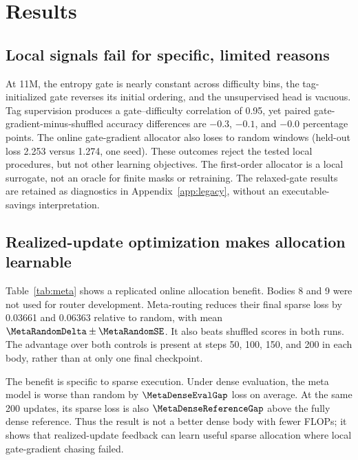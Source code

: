 \documentclass{article}
\begin{document}
\section{Results}

\subsection{Local signals fail for specific, limited reasons}
\label{sec:local-results}
At 11M, the entropy gate is nearly constant across difficulty bins, the
tag-initialized gate reverses its initial ordering, and the unsupervised head
is vacuous. Tag supervision produces a gate--difficulty correlation of 0.95,
yet paired gate-gradient-minus-shuffled accuracy differences are $-0.3$,
$-0.1$, and $-0.0$ percentage points. The online gate-gradient allocator also
loses to random windows (held-out loss 2.253 versus 1.274, one seed). These
outcomes reject the tested local procedures, but not other learning objectives.
The first-order allocator is a local surrogate, not an oracle for finite masks
or retraining. The relaxed-gate results are retained as diagnostics in
Appendix~\ref{app:legacy}, without an executable-savings interpretation.

\subsection{Realized-update optimization makes allocation learnable}
\label{sec:meta-results}
\begin{table}[H]
\centering
\caption{Online meta-routing after 200 steps at 50\% FFN activity. Losses use
sparse evaluation. Differences are meta minus control: negative loss and
positive accuracy differences favor meta. The final row is mean $\pm$ standard
error over two confirmation bodies; accuracy differences are percentage points.}
\label{tab:meta}
{\small\onlinemetatable}
\end{table}

Table~\ref{tab:meta} shows a replicated online allocation benefit. Bodies 8 and
9 were not used for router development. Meta-routing reduces their final sparse
loss by 0.03661 and 0.06363 relative to random, with mean
$\MetaRandomDelta\pm\MetaRandomSE$. It also beats shuffled scores in both runs.
The advantage over both controls is present at steps 50, 100, 150, and 200 in
each body, rather than at only one final checkpoint.

The benefit is specific to sparse execution. Under dense evaluation, the meta
model is worse than random by $\MetaDenseEvalGap$ loss on average. At the same
200 updates, its sparse loss is also $\MetaDenseReferenceGap$ above the fully
dense reference. Thus the result is not a better dense body with fewer FLOPs;
it shows that realized-update feedback can learn useful sparse allocation where
local gate-gradient chasing failed.
\end{document}
